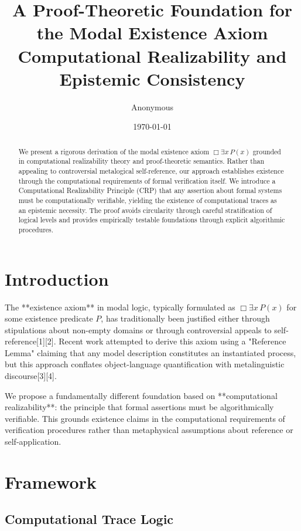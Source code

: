 \documentclass[12pt]{article}
\title{A Proof-Theoretic Foundation for the Modal Existence Axiom\\
\vspace{0.5em}
\large Computational Realizability and Epistemic Consistency}
\author{Anonymous}
\date{\today}
\begin{document}
\maketitle

\begin{abstract}
We present a rigorous derivation of the modal existence axiom $\Box\exists x\,P(x)$ grounded in computational realizability theory and proof-theoretic semantics. Rather than appealing to controversial metalogical self-reference, our approach establishes existence through the computational requirements of formal verification itself. We introduce a Computational Realizability Principle (CRP) that any assertion about formal systems must be computationally verifiable, yielding the existence of computational traces as an epistemic necessity. The proof avoids circularity through careful stratification of logical levels and provides empirically testable foundations through explicit algorithmic procedures.
\end{abstract}

\section{Introduction}

The **existence axiom** in modal logic, typically formulated as $\Box\exists x\,P(x)$ for some existence predicate $P$, has traditionally been justified either through stipulations about non-empty domains or through controversial appeals to self-reference[1][2]. Recent work attempted to derive this axiom using a "Reference Lemma" claiming that any model description constitutes an instantiated process, but this approach conflates object-language quantification with metalinguistic discourse[3][4].

We propose a fundamentally different foundation based on **computational realizability**: the principle that formal assertions must be algorithmically verifiable. This grounds existence claims in the computational requirements of verification procedures rather than metaphysical assumptions about reference or self-application.

\section{Framework}

\subsection{Computational Trace Logic}
\end{document}
